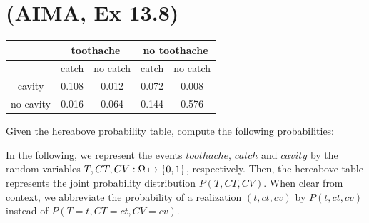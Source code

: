 \documentclass[11pt, a4paper]{article}
\begin{document}
\newpage

\section{(AIMA, Ex 13.8)}

\begin{table}[h]
    \centering
    \begin{tabular}{|c|c|c|c|c|}
        \hline
        & \multicolumn{2}{c|}{toothache} & \multicolumn{2}{c|}{no toothache} \\ \hline
        & catch & no catch & catch & no catch \\ \hline
        cavity & 0.108 & 0.012 & 0.072 & 0.008 \\ \hline
        no cavity & 0.016 & 0.064 & 0.144 & 0.576 \\ \hline
    \end{tabular}
\end{table}

Given the hereabove probability table, compute the following probabilities:

\begin{solution}
    In the following, we represent the events $toothache$, $catch$ and $cavity$ by the random variables $T, CT, CV: \Omega \mapsto \{0, 1\}$, respectively. Then, the hereabove table represents the joint probability distribution $P(T, CT, CV)$. When clear from context, we abbreviate the probability of a realization $(t, ct, cv)$ by $P(t, ct, cv)$ instead of $P(T = t, CT = ct, CV = cv)$.
\end{solution}
\end{document}

